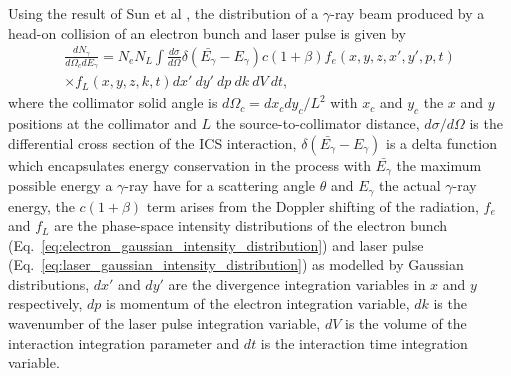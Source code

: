 \documentclass[../main.tex]{subfiles}
\begin{document}
Using the result of Sun et al \cite{sun2009characterizations,sun2011theoretical}, the distribution of a $\gamma$-ray beam produced by a head-on collision of an electron bunch and laser pulse is given by
\begin{multline}
\frac{dN_{\gamma}}{d\Omega_{c} dE_{\gamma}} = N_{e}N_{L}\int \frac{d\sigma}{d\Omega}\delta\left(\bar{E_{\gamma}}-E_{\gamma}\right)c\left(1+\beta\right)f_{e}\left(x,y,z,x',y',p,t\right)\\ \times f_L\left(x,y,z,k,t\right)dx'~dy'~dp~dk~dV~dt,
\label{eq:central_distribution_sun}
\end{multline}
where the collimator solid angle is $d\Omega_{c} = dx_{c}dy_{c}/L^{2}$ with $x_{c}$ and $y_{c}$ the $x$ and $y$ positions at the collimator and $L$ the source-to-collimator distance, $d\sigma/d\Omega$ is the differential cross section of the ICS interaction, $\delta\left(\bar{E_{\gamma}}-E_{\gamma}\right)$ is a delta function which encapsulates energy conservation in the process with $\bar{E_{\gamma}}$ the maximum possible energy a $\gamma$-ray have for a scattering angle $\theta$ and $E_{\gamma}$ the actual $\gamma$-ray energy, the $c\left(1+\beta\right)$ term arises from the Doppler shifting of the radiation, $f_{e}$ and $f_{L}$ are the phase-space intensity distributions of the electron bunch (Eq.~\ref{eq:electron_gaussian_intensity_distribution}) and laser pulse (Eq.~\ref{eq:laser_gaussian_intensity_distribution}) as modelled by Gaussian distributions, $dx'$ and $dy'$ are the divergence integration variables in $x$ and $y$ respectively, $dp$ is momentum of the electron integration variable, $dk$ is the wavenumber of the laser pulse integration variable, $dV$ is the volume of the interaction integration parameter and  $dt$ is the interaction time integration variable. 
\end{document}
